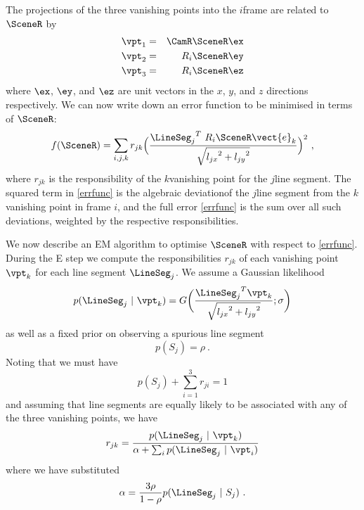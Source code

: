 
The projections of the three vanishing points into the $i$\th frame
are related to $\SceneR$ by
\begin{eqnarray}
  \vpt_1 & = & \CamR \SceneR \ex \\
  \vpt_2 & = & R_i \SceneR \ey \\
  \vpt_3 & = & R_i \SceneR \ez
\end{eqnarray}
where $\ex$, $\ey$, and $\ez$ are unit vectors in
the $x$, $y$, and $z$ directions respectively. We can now write down
an error function to be minimised in terms of $\SceneR$:
\begin{equation}
  \label{errfunc}
  f(\SceneR) = \sum_{i,j,k} r_{jk}
  \Bigl(\frac{{\LineSeg_j}^T ~ R_i \SceneR \vect{e}_k}{\sqrt{{l_{jx}}^2 +
      {l_{jy}}^2}}\Bigr)^2 ~,
\end{equation}
where $r_{jk}$ is the responsibility of the $k$\th vanishing point for
the $j$\th line segment. The squared term in \eqref{errfunc} is the
algebraic deviation\footnotemark of the $j$\th line segment from the
$k$\th vanishing point in frame $i$, and the full error
\eqref{errfunc} is the sum over all such deviations, weighted by the
respective responsibilities.


We now describe an EM algorithm to optimise $\SceneR$ with respect to
\eqref{errfunc}. During the E step we compute the responsibilities
$r_{jk}$ of each vanishing point $\vpt_k$ for each line segment
$\LineSeg_j$. We assume a Gaussian likelihood
\begin{equation}
  \label{line-lik}
  p(\LineSeg_j ~|~ \vpt_k) = G\biggl( \frac{{\LineSeg_j}^T \vpt_k}
  {\sqrt{{l_{jx}}^2 + {l_{jy}}^2}} ; \sigma\biggr)
\end{equation}
as well as a fixed prior on observing a spurious line segment
\begin{equation}
  p(S_j) = \rho ~.
\end{equation}
Noting that we must have
\begin{equation}
  p(S_j) + \sum_{i=1}^3 r_{ji} = 1
\end{equation}
and assuming that line segments are equally likely to be associated
with any of the three vanishing points, we have
\begin{equation}
  r_{jk} = \frac{p(\LineSeg_j ~|~ \vpt_k)}
  {\alpha + \sum_i p(\LineSeg_j ~|~ \vpt_i)}
\end{equation}
where we have substituted
\begin{equation}
  \alpha = \frac{3\rho}{1-\rho} p(\LineSeg_j ~|~ S_j) ~.
\end{equation}

